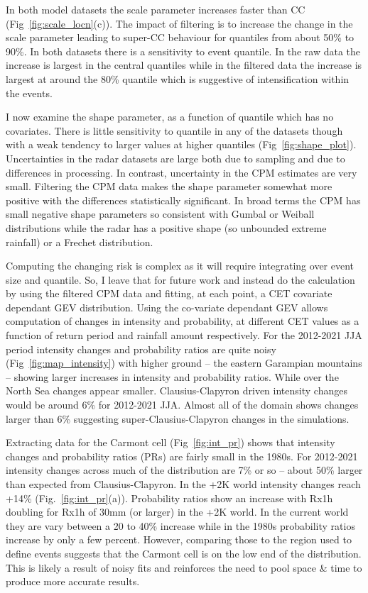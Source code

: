 \documentclass[11pt,a4paper]{article}
\begin{document}
In both model datasets the scale parameter increases faster than CC (Fig~\ref{fig:scale_locn}(c)). The impact of filtering is to increase the change in the scale parameter leading to super-CC behaviour for quantiles from about 50\% to 90\%.  In both datasets there is a sensitivity to event quantile. In the raw data the increase is largest in the central quantiles while in the filtered data the increase is largest at around the 80\% quantile which is suggestive of intensification within the events. 

I now examine the shape parameter, as a function of quantile which  has no covariates.  There is little sensitivity to quantile in any of the datasets though with a weak tendency to larger values at higher quantiles (Fig~\ref{fig:shape_plot}).  Uncertainties in the radar datasets are large both due to sampling and due to differences in processing. In contrast, uncertainty in the CPM estimates are very small. Filtering the CPM data makes the shape parameter somewhat more positive with the differences statistically significant. In broad terms the CPM has small negative  shape parameters so consistent with Gumbal or Weiball distributions while the radar has a positive shape (so unbounded extreme rainfall)  or a Frechet distribution. 

Computing the changing risk is complex as it will require integrating over event size and quantile. So, I leave that for future work  and instead do the  calculation by using the  filtered CPM data and fitting, at each point, a CET covariate dependant GEV distribution.  Using the co-variate dependant GEV allows computation of changes in intensity and probability, at different CET values as a function of return period and  rainfall amount respectively. For the 2012-2021 JJA period intensity changes and probability ratios are quite noisy (Fig~\ref{fig:map_intensity}) with higher ground -- the eastern Garampian mountains  -- showing larger increases in intensity and probability ratios. While over the North Sea changes appear smaller. Clausius-Clapyron driven intensity changes would be around 6\% for 2012-2021 JJA. Almost all of the domain shows changes larger than 6\% suggesting super-Clausius-Clapyron changes in the simulations. 

Extracting data for the Carmont cell (Fig~\ref{fig:int_pr}) shows that intensity changes and probability ratios (PRs) are fairly small in the 1980s. For 2012-2021 intensity changes across much of the distribution are 7\% or so -- about 50\% larger than expected from Clausius-Clapyron. In the +2K world intensity changes reach +14\% (Fig.~\ref{fig:int_pr}(a)). Probability ratios show an increase with Rx1h 
doubling for Rx1h of 30mm (or larger) in the +2K world. In the current world they are vary between a  20 to 40\% increase while in the 1980s probability ratios increase by only a few percent.  However, comparing those to the region used to define events suggests that the Carmont cell is on the low end of the distribution. This is likely a result of noisy fits and reinforces the need to pool space \& time to produce more accurate results. 
\end{document}
